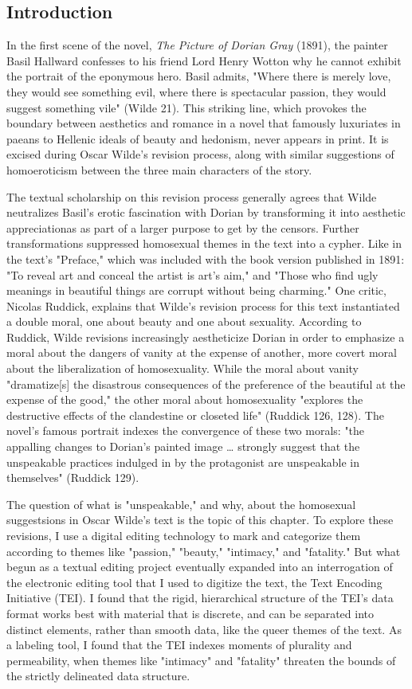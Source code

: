 \documentclass[11pt]{article}
\begin{document}
\subsection{Introduction}
\label{sec:org704c05a}
In the first scene of the novel, \emph{The Picture of Dorian Gray} (1891),
the painter Basil Hallward confesses to his friend Lord Henry Wotton
why he cannot exhibit the portrait of the eponymous hero. Basil
admits, "Where there is merely love, they would see something evil,
where there is spectacular passion, they would suggest something vile"
(Wilde 21). This striking line, which provokes the boundary between
aesthetics and romance in a novel that famously luxuriates in paeans
to Hellenic ideals of beauty and hedonism, never appears in print. It
is excised during Oscar Wilde's revision process, along with similar
suggestions of homoeroticism between the three main characters of the
story.

The textual scholarship on this revision process generally agrees that
Wilde neutralizes Basil's erotic fascination with Dorian by
transforming it into aesthetic appreciationas as part of a larger
purpose to get by the censors. Further transformations suppressed
homosexual themes in the text into a cypher. Like in the text's
"Preface," which was included with the book version published in 1891:
"To reveal art and conceal the artist is art's aim," and "Those who
find ugly meanings in beautiful things are corrupt without being
charming." One critic, Nicolas Ruddick, explains that Wilde's revision
process for this text instantiated a double moral, one about beauty
and one about sexuality. According to Ruddick, Wilde revisions
increasingly aestheticize Dorian in order to emphasize a moral about
the dangers of vanity at the expense of another, more covert moral
about the liberalization of homosexuality. While the moral about
vanity "dramatize[s] the disastrous consequences of the preference of
the beautiful at the expense of the good," the other moral about
homosexuality "explores the destructive effects of the clandestine or
closeted life" (Ruddick 126, 128). The novel's famous portrait indexes
the convergence of these two morals: "the appalling changes to
Dorian's painted image \ldots{} strongly suggest that the unspeakable
practices indulged in by the protagonist are unspeakable in
themselves" (Ruddick 129).

The question of what is "unspeakable," and why, about the homosexual
suggestsions in Oscar Wilde's text is the topic of this chapter. To
explore these revisions, I use a digital editing technology to mark
and categorize them according to themes like "passion," "beauty,"
"intimacy," and "fatality." But what begun as a textual editing
project eventually expanded into an interrogation of the electronic
editing tool that I used to digitize the text, the Text Encoding
Initiative (TEI). I found that the rigid, hierarchical structure of
the TEI's data format works best with material that is discrete, and
can be separated into distinct elements, rather than smooth data, like
the queer themes of the text. As a labeling tool, I found that the TEI
indexes moments of plurality and permeability, when themes like
"intimacy" and "fatality" threaten the bounds of the strictly
delineated data structure. 
\end{document}
